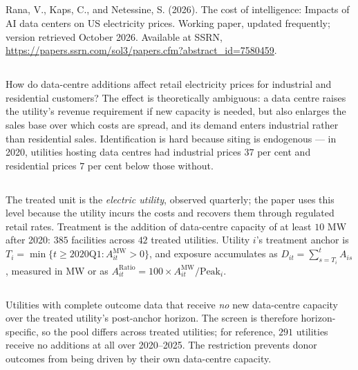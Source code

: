 \documentclass[11pt]{article}
\begin{document}
\subsection{}
Rana, V., Kaps, C., and Netessine, S. (2026). The cost of intelligence:
Impacts of AI data centers on US electricity prices. Working paper, updated
frequently; version retrieved October 2026. Available at SSRN,
\url{https://papers.ssrn.com/sol3/papers.cfm?abstract_id=7580459}.

\subsection{}
How do data-centre additions affect retail electricity prices for industrial
and residential customers? The effect is theoretically ambiguous: a data centre
raises the utility's revenue requirement if new capacity is needed, but also
enlarges the sales base over which costs are spread, and its demand enters
industrial rather than residential sales. Identification is hard because siting
is endogenous --- in 2020, utilities hosting data centres had industrial prices
$37$ per cent and residential prices $7$ per cent below those without.

\subsection{}
The treated unit is the \emph{electric utility}, observed quarterly; the paper
uses this level because the utility incurs the costs and recovers them through
regulated retail rates. Treatment is the addition of data-centre capacity of at
least $10$ MW after 2020: $385$ facilities across $42$ treated utilities.
Utility $i$'s treatment anchor is
$T_i = \min\{t \ge 2020\text{Q1} : A^{\mathrm{MW}}_{it} > 0\}$, and exposure accumulates
as $D_{it} = \sum_{s=T_i}^{t} A_{is}$, measured in MW or as
$A^{\mathrm{Ratio}}_{it} = 100 \times A^{\mathrm{MW}}_{it}/\text{Peak}_i$.

\subsection{}
Utilities with complete outcome data that receive \emph{no} new data-centre
capacity over the treated utility's post-anchor horizon. The screen is
therefore horizon-specific, so the pool differs across treated utilities; for
reference, $291$ utilities receive no additions at all over 2020--2025. The
restriction prevents donor outcomes from being driven by their own
data-centre capacity.
\end{document}
